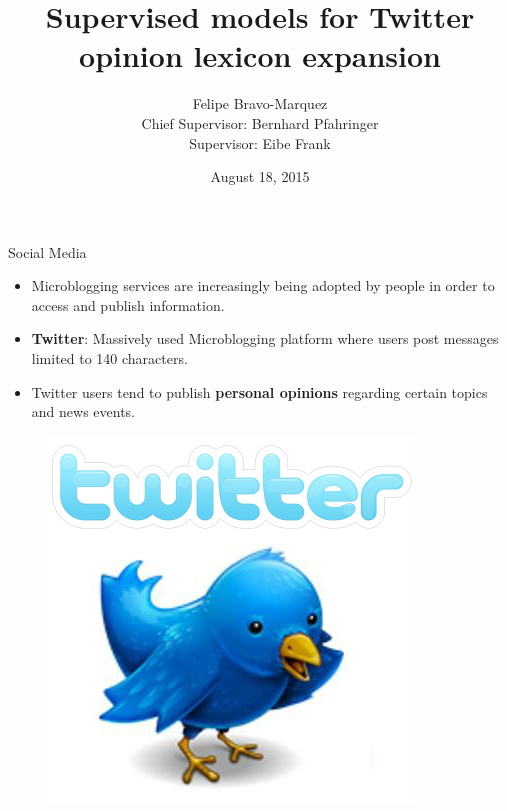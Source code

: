 \documentclass[handout]{beamer}
\title{Supervised models for Twitter opinion lexicon expansion}
\author[Felipe Bravo Márquez]{\footnotesize
 \textcolor[rgb]{0.00,0.00,1.00}{Felipe Bravo-Marquez} \\ Chief Supervisor: Bernhard Pfahringer \\  Supervisor: Eibe Frank}
\institute{University of Waikato \\ Computer Science Department }
\date{August 18, 2015}
\begin{document}
\begin{frame}
\titlepage


\end{frame}



\begin{frame}{Social Media}
\begin{scriptsize}
\begin{itemize}
 \item Microblogging services are increasingly being adopted by people in order to access and publish information.  
 \item \textbf{Twitter}: Massively used Microblogging platform where users post messages limited to 140 characters. 
 \item Twitter users tend to publish \textbf{personal opinions} regarding certain topics and news events. 
\end{itemize}
  \begin{figure}[h]
        	\includegraphics[scale = 0.2]{pics/twitter.png}
        \end{figure}

\end{scriptsize}
\end{frame}
\end{document}
